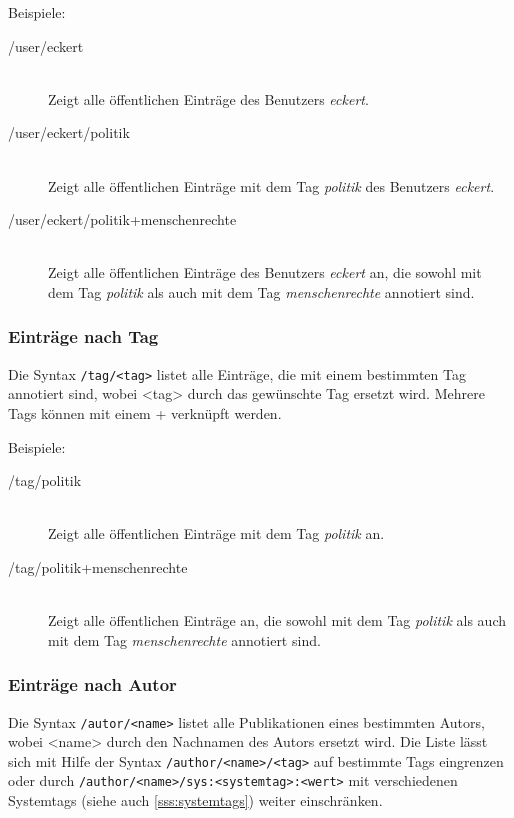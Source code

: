Beispiele:
\begin{description}
    \item [/user/eckert] \hfill \\ 
    Zeigt alle öffentlichen Einträge des Benutzers \textit{eckert}.
    \item [/user/eckert/politik] \hfill \\
    Zeigt alle öffentlichen Einträge mit dem Tag \textit{politik} des Benutzers \textit{eckert}.
    \item [/user/eckert/politik+menschenrechte] \hfill \\
    Zeigt alle öffentlichen Einträge des Benutzers \textit {eckert} an, die sowohl mit dem Tag \textit{politik} als auch mit dem Tag \textit{menschenrechte} annotiert sind.
\end{description}

\subsubsection*{Einträge nach Tag}
\label{sss:nachTag}
Die Syntax \texttt{/tag/<tag>} listet alle Einträge, die mit einem bestimmten Tag annotiert sind, wobei <tag> durch das gewünschte Tag ersetzt wird. Mehrere Tags können mit einem + verknüpft werden.

Beispiele:
\begin{description}
    \item [/tag/politik] \hfill \\
    Zeigt alle öffentlichen Einträge mit dem Tag \textit{politik} an.
    \item [/tag/politik+menschenrechte] \hfill \\
    Zeigt alle öffentlichen Einträge an, die sowohl mit dem Tag \textit{politik} als auch mit dem Tag \textit{menschenrechte} annotiert sind.
\end{description}

\subsubsection*{Einträge nach Autor}
\label{sss:nachAutor}

Die Syntax \texttt{/autor/<name>} listet alle Publikationen eines bestimmten Autors, wobei <name> durch den Nachnamen des Autors ersetzt wird. Die Liste lässt sich mit Hilfe der Syntax \texttt{/author/<name>/<tag>} auf bestimmte Tags eingrenzen oder durch \texttt{/author/<name>/sys:<systemtag>:<wert>} mit verschiedenen Systemtags (siehe auch \autoref{sss:systemtags}) weiter einschränken.

